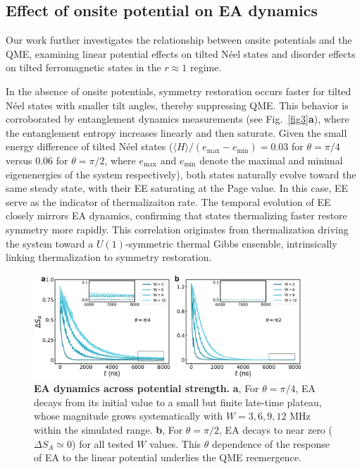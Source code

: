 \documentclass[reprint,superscriptaddress,preprintnumbers,longbibliography,
amsmath,amssymb,aps,floatfix,pra,twocolumn, tightenlines %
]{revtex4-2}
\begin{document}
    
    \subsection{Effect of onsite potential on EA dynamics}
    
    Our work further investigates the relationship between onsite potentials and the QME, examining linear potential effects on tilted N\'eel states and disorder effects on tilted ferromagnetic states in the $r\approx 1$ regime.

    In the absence of onsite potentials, symmetry restoration occurs faster for tilted N\'eel states with smaller tilt angles, thereby suppressing QME. This behavior is corroborated by entanglement dynamics measurements (see Fig.~\ref{fig3}\textbf{a}), where the entanglement entropy increases linearly and then saturate. 
    Given the small energy difference of tilted N\'eel states ($\langle H \rangle / (e_{\text{max}} - e_{\text{min}}) = 0.03$ for $\theta = \pi/4$ versus $0.06$ for $\theta=\pi/2$, where $e_{\text{max}}$ and $e_{\text{min}}$ denote the maximal and minimal eigenenergies of the system respectively), both states naturally evolve toward the same steady state, with their EE saturating at the Page value.
    In this case, EE serve as the indicator of thermalizaiton rate. The temporal evolution of EE closely mirrors EA dynamics, confirming that states thermalizing faster restore symmetry more rapidly. This correlation originates from thermalization driving the system toward a $U(1)$-symmetric thermal Gibbs ensemble, intrinsically linking thermalization to symmetry restoration.
    
    \begin{figure}[t]
    \centering
    \includegraphics[width=0.9\textwidth]{suppFig/SuppFig4_EA_W_longtime.pdf}

    \caption{  \textbf{EA dynamics across potential strength.} 
        \textbf{a}, For $\theta = \pi/4$, EA decays from its initial value to a small but finite late-time plateau, whose magnitude grows systematically with $W =3,6,9,12$ MHz within the simulated range. 
        \textbf{b}, For $\theta = \pi/2$, EA decays to near zero ($\Delta S_A \simeq 0$) for all tested $W$ values. 
        This $\theta$ dependence of the response of EA to the linear potential underlies the QME reemergence.
    }
    \label{fig:longtime.EA.W}
    \end{figure}
    
\end{document}
